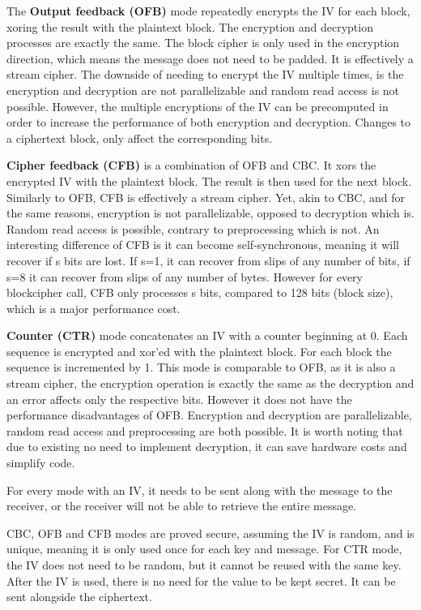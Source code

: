The \textbf{Output feedback (OFB)} mode repeatedly encrypts the IV for each block, xoring the result with the plaintext block.
The encryption and decryption processes are exactly the same.
The block cipher is only used in the encryption direction, which means the message does not need to be padded. It is effectively a stream cipher.
The downside of needing to encrypt the IV multiple times, is the encryption and decryption are not parallelizable and random read access is not possible. However, the multiple encryptions of the IV can be precomputed in order to increase the performance of both encryption and decryption.
Changes to a ciphertext block, only affect the corresponding bits.

\textbf{Cipher feedback (CFB)} is a combination of OFB and CBC. It xors the encrypted IV with the plaintext block. The result is then used for the next block.
Similarly to OFB, CFB is effectively a stream cipher. Yet, akin to CBC, and for the same reasons, encryption is not parallelizable, opposed to decryption which is. Random read access is possible, contrary to preprocessing which is not.
An interesting difference of CFB is it can become self-synchronous, meaning it will recover if s bits are lost. If s=1, it can recover from slips of any number of bits, if s=8 it can recover from slips of any number of bytes. However for every blockcipher call, CFB only processes s bits, compared to 128 bits (block size), which is a major performance cost.

\textbf{Counter (CTR)} mode concatenates an IV with a counter beginning at 0. Each sequence is encrypted and xor'ed with the plaintext block. For each block the sequence is incremented by 1.
This mode is comparable to OFB, as it is also a stream cipher, the encryption operation is exactly the same as the decryption and an error affects only the respective bits.
However it does not have the performance disadvantages of OFB. Encryption and decryption are parallelizable, random read access and preprocessing are both possible.
It is worth noting that due to existing no need to implement decryption, it can save hardware costs and simplify code.

For every mode with an IV, it needs to be sent along with the message to the receiver, or the receiver will not be able to retrieve the entire message.

CBC, OFB and CFB modes are proved secure, assuming the IV is random, and is unique, meaning it is only used once for each key and message. For CTR mode, the IV does not need to be random, but it cannot be reused with the same key.
After the IV is used, there is no need for the value to be kept secret. It can be sent alongside the ciphertext.

